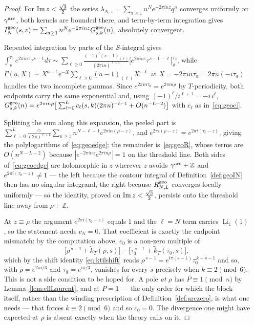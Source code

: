 \documentclass[11pt]{article}
\newcommand{\ZZ}{\mathbb{Z}}
\newcommand{\tk}{\widetilde{k}_T}
\DeclareMathOperator{\Li}{Li}
\begin{document}
\begin{proof}
For ${\rm Im}\,z<\tfrac{\sqrt3}{2}$ the series
$\lambda_{N,z}=\sum_{n\ge1}n^{N}e^{-2\pi inz}q^{n}$ converges uniformly on $\gamma^{\rm arc}$,
both kernels are bounded there, and term-by-term integration gives
$I^{\rm geo}_N(s,z)=\sum_{n\ge1}n^{N}e^{-2\pi inz}G^{\rm geo}_{s,k}(n)$, absolutely convergent.

Repeated integration by parts of the $S$-integral gives
$\int_{\rho}^{\tau_0}e^{2\pi in\tau}\tau^{s-1}d\tau
\sim\sum_{\ell\ge0}\frac{(-1)^{\ell}(s-1)_{(\ell)}}{(2\pi in)^{\ell+1}}
\big[e^{2\pi in\tau}\tau^{s-1-\ell}\big]_{\rho}^{\tau_0}$, while
$\Gamma(a,X)\sim X^{a-1}e^{-X}\sum_{\ell\ge0}(a-1)_{(\ell)}X^{-\ell}$ at
$X=-2\pi in\tau_0=2\pi n(-i\tau_0)$ handles the two incomplete gammas. Since
$e^{2\pi in\tau_0}=e^{2\pi in\rho}$ by $T$-periodicity, both endpoints carry the same exponential
and, using $(-1)^{\ell}/i^{\ell+1}=-i\,i^{\ell}$,
$G^{\rm geo}_{s,k}(n)=e^{2\pi in\rho}\big[\sum_{\ell=0}^{L}c_\ell(s,k)(2\pi n)^{-\ell-1}
+O(n^{-L-2})\big]$ with $c_\ell$ as in~\eqref{eq:geocl}.

Splitting the sum along this expansion, the peeled part is
$\sum_{\ell=0}^{L}\frac{c_\ell}{(2\pi)^{\ell+1}}\sum_{n\ge1}n^{N-\ell-1}e^{2\pi in(\rho-z)}$, and
$e^{2\pi i(\rho-z)}=e^{2\pi i(\tau_0-z)}$, giving the polylogarithms
of~\eqref{eq:geoedge}; the remainder is~\eqref{eq:geoR}, whose terms are $O(n^{N-L-2})$ because
$|e^{-2\pi inz}e^{2\pi in\rho}|=1$ on the threshold line. Both sides of~\eqref{eq:geoedge} are holomorphic in
$z$ wherever $z$ avoids $\gamma^{\rm arc}+\ZZ$ and $e^{2\pi i(\tau_0-z)}\ne1$ --- the left because
the contour integral of Definition~\ref{def:geoIN} then has no singular integrand, the right
because $R^{\rm geo}_{N,L}$ converges locally uniformly --- so the identity, proved on
${\rm Im}\,z<\tfrac{\sqrt3}{2}$, persists onto the threshold line away from $\rho+\ZZ$.

At $z\equiv\rho$ the argument $e^{2\pi i(\tau_0-z)}$ equals $1$ and the $\ell=N$ term carries
$\Li_1(1)$, so the statement needs $c_N=0$. That coefficient is exactly the endpoint mismatch: by
the computation above, $c_0$ is a non-zero multiple of
\begin{equation}\label{eq:endpointmismatch}
\big[\rho^{\,s-1}+\tk(\rho,s)\big]-\big[\tau_0^{\,s-1}+\tk(\tau_0,s)\big],
\end{equation}
which by the shift identity \eqref{eq:ktilshift} reads
$\rho^{\,s-1}=e^{i\pi(s-1)}\tau_0^{\,k-s-1}$ and so, with $\rho=e^{2\pi i/3}$ and
$\tau_0=e^{i\pi/3}$, vanishes for every $s$ precisely when $k\equiv2\pmod6$. This is not a side
condition to be hoped for. A pole \emph{at} $\rho$ has $P\equiv1\pmod n$ by
Lemma~\ref{lem:ellLaurent}, and at $P=1$ --- the only order for which the block itself, rather
than the winding prescription of Definition~\ref{def:arczero}, is what one needs --- that forces
$k\equiv2\pmod6$ and so $c_0=0$. The divergence one might have expected at $\rho$ is absent
exactly when the theory calls on it.
\end{proof}
\end{document}
